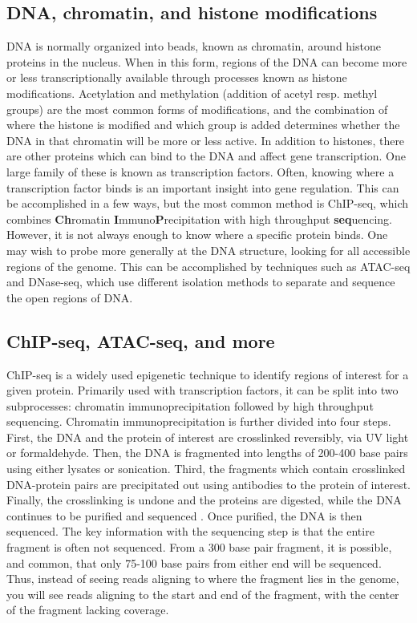 \documentclass[a4paper]{article}
\begin{document}
    \subsection{DNA, chromatin, and histone modifications}
    DNA is normally organized into beads, known as chromatin, around histone proteins in the nucleus. When in this form,
    regions of the DNA can become more or less transcriptionally available through processes known as histone modifications.
    Acetylation and methylation (addition of acetyl resp. methyl groups) are the most common forms of modifications, and
    the combination of where the histone is modified and which group is added determines whether the DNA in that chromatin
    will be more or less active. In addition to histones, there are other proteins which can bind to the DNA and affect
    gene transcription. One large family of these is known as transcription factors. Often, knowing where a transcription
    factor binds is an important insight into gene regulation. This can be accomplished in a few ways, but the most common
    method is ChIP-seq, which combines \textbf{Ch}romatin \textbf{I}mmuno\textbf{P}recipitation with high throughput \textbf{seq}uencing.
    However, it is not always enough to know where a specific protein binds. One may wish to probe
    more generally at the DNA structure, looking for all accessible regions of the genome. This can be accomplished by
    techniques such as ATAC-seq and DNase-seq, which use different isolation methods to separate and sequence the open regions of DNA.

    \subsection{ChIP-seq, ATAC-seq, and more}
    ChIP-seq \cite{johnson_genome-wide_2007} is a widely used epigenetic technique to identify regions of interest for a given protein. Primarily used
    with transcription factors, it can be split into two subprocesses: chromatin immunoprecipitation followed by high
    throughput sequencing. Chromatin immunoprecipitation is further divided into four steps. First, the DNA and the protein
    of interest are crosslinked reversibly, via UV light or formaldehyde. Then, the DNA is fragmented into lengths of 200-400
    base pairs using either lysates or sonication. Third, the fragments which contain crosslinked DNA-protein pairs are
    precipitated out using antibodies to the protein of interest. Finally, the crosslinking is undone and the proteins
    are digested, while the DNA continues to be purified and sequenced \cite{collas_current_2010}. Once purified, the DNA is then sequenced.
    The key information with the sequencing step is that the entire fragment is often not sequenced. From a 300 base pair
    fragment, it is possible, and common, that only 75-100 base pairs from either end will be sequenced. Thus, instead
    of seeing reads aligning to where the fragment lies in the genome, you will see reads aligning to the start and end
    of the fragment, with the center of the fragment lacking coverage.
\end{document}
